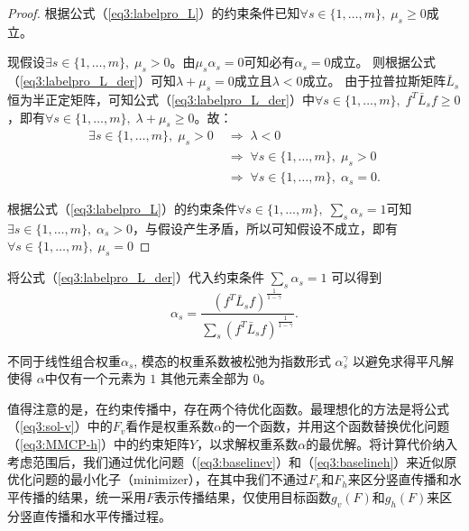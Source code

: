 \begin{proof}
    根据公式（\ref{eq3:labelpro_L}）的约束条件已知$ \forall s \in \{1,\dots,m\}, \;\mu_s \ge 0$成立。

    现假设$\exists s \in \{1,\dots,m\}, \; \mu_s>0 $。由$ \mu_s\alpha_s=0 $可知必有$\alpha_s=0 $成立。
    则根据公式（\ref{eq3:labelpro_L_der}）可知$\lambda + \mu_s = 0 $成立且$ \lambda<0 $成立。
    由于拉普拉斯矩阵$ {\bar{{L}}}_s $恒为半正定矩阵\cite{chung1997spectral}，可知公式（\ref{eq3:labelpro_L_der}）中$\forall s \in \{1,\dots,m\}, \;{f}^T {\bar{{L}}}_s{f} \ge 0$，即有$\forall s \in \{1,\dots,m\}, \; \lambda + \mu_s \ge 0 $。故：
    \begin{equation}
        \begin{split}
        \exists s \in \{1,\dots,m\}, \; \mu_s>0\; &\Rightarrow \;\lambda<0 \\&\Rightarrow \;\forall s \in \{1,\dots,m\}, \; \mu_s>0 \\&\Rightarrow \; \forall s \in \{1,\dots,m\}, \;\alpha_s=0.     
        \end{split}
    \end{equation}

    根据公式（\ref{eq3:labelpro_L}）的约束条件$ \forall s \in \{1,\dots,m\}, \;\sum_s \alpha_s = 1$可知$ \exists s \in \{1,\dots,m\}, \;\alpha_s>0$，与假设产生矛盾，所以可知假设不成立，即有$\forall s \in \{1,\dots,m\}, \; \mu_s=0 $
\end{proof}

将公式（\ref{eq3:labelpro_L_der}）代入约束条件 $ \sum_s \alpha_s=1 $ 可以得到
\begin{equation}
\alpha_s = \frac{({f}^T \bar{{L}}_s{f})^\frac{1}{1-\gamma}}{\sum_s({f}^T \bar{{L}}_s{f})^\frac{1}{1-\gamma}}.
\end{equation}

不同于线性组合权重$ \alpha_s$, 模态的权重系数被松弛为指数形式 $ \alpha_s^\gamma $ 以避免求得平凡解使得 $ {\alpha} $中仅有一个元素为 $ 1 $ 其他元素全部为 $ 0 $。

值得注意的是，在约束传播中，存在两个待优化函数。最理想化的方法是将公式（\ref{eq3:sol-v}）中的$ {F}_v $看作是权重系数$\alpha$的一个函数，并用这个函数替换优化问题（\ref{eq3:MMCP-h}）中的约束矩阵$Y$，以求解权重系数$\alpha$的最优解。将计算代价纳入考虑范围后，我们通过优化问题（\ref{eq3:baselinev}）和（\ref{eq3:baselineh}）来近似原优化问题的最小化子（minimizer），在其中我们不通过$F_v$和$F_h$来区分竖直传播和水平传播的结果，统一采用$F$表示传播结果，仅使用目标函数$g_v({F})$和$g_h({F})$来区分竖直传播和水平传播过程。

